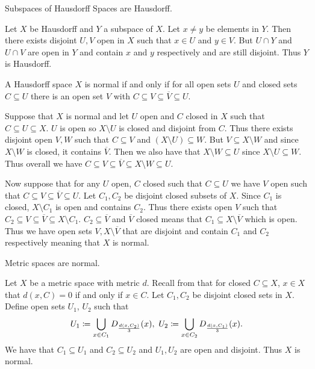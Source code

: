 \documentclass[letterpaper, 11pt]{article}
\begin{document}
\begin{exercise}
  Subspaces of Hausdorff Spaces are Hausdorff.
\end{exercise}
\begin{pf}
  Let $X$ be Hausdorff and $Y$ a subspace of $X$.
  Let $x \neq y$ be elements in $Y$.
  Then there exists disjoint $U, V$ open in $X$ such that $x \in U$ and $y \in V$.
  But $U \cap Y$ and $U \cap V$ are open in $Y$ and contain $x$ and $y$ respectively and are still disjoint.
  Thus $Y$ is Hausdorff.
\end{pf}

\begin{exercise}
  A Hausdorff space $X$ is normal if and only if for all open sets $U$ and closed sets $C \subseteq U$ there is an open set $V$ with $C \subseteq V \subseteq \overline{V} \subseteq U$.
\end{exercise}
\begin{pf}
  Suppose that $X$ is normal and let $U$ open and $C$ closed in $X$ such that $C \subseteq U \subseteq X$.
  $U$ is open so $X \setminus U$ is closed and disjoint from $C$.
  Thus there exists disjoint open $V, W$ such that $C \subseteq V$ and $(X \setminus U) \subseteq W$.
  But $V \subseteq X \setminus W$ and since $X \setminus W$ is closed, it contains $\overline{V}$.
  Then we also have that $X \setminus W \subseteq U$ since $X \setminus U \subseteq W$.
  Thus overall we have $C \subseteq V \subseteq \overline{V} \subseteq X \setminus W \subseteq U$.

  Now suppose that for any $U$ open, $C$ closed such that $C \subseteq U$ we have $V$ open such that $C \subseteq V \subseteq \overline{V} \subseteq U$.
  Let $C_{1}, C_{2}$ be disjoint closed subsets of $X$.
  Since $C_{1}$ is closed, $X \setminus C_{1}$ is open and contains $C_{2}$.
  Thus there exists open $V$ such that $C_{2} \subseteq V \subseteq \overline{V} \subseteq X \setminus C_{1}$.
  $C_{2} \subseteq \overline{V}$ and $\overline{V}$ closed means that $C_{1} \subseteq X \setminus \overline{V}$ which is open.
  Thus we have open sets $V, X \setminus \overline{V}$ that are disjoint and contain $C_{1}$ and $C_{2}$ respectively meaning that $X$ is normal.
\end{pf}

\begin{exercise}
  Metric spaces are normal.
\end{exercise}
\begin{pf}
  Let $X$ be a metric space with metric $d$.
  Recall from  that for closed $C \subseteq X$, $x \in X$ that $d(x, C) = 0$ if and only if $x \in C$.
  Let $C_{1}, C_{2}$ be disjoint closed sets in $X$.
  Define open sets $U_{1}$, $U_{2}$ such that
  \[
    U_{1} \coloneqq \bigcup_{x \in C_{1}} D_{\frac{d(x, C_{2})}{3}}(x),~ U_{2} \coloneqq \bigcup_{x \in C_{2}} D_{\frac{d(x, C_{1})}{3}}(x).
  \]
  We have that $C_{1} \subseteq U_{1}$ and $C_{2} \subseteq U_{2}$ and $U_{1}, U_{2}$ are open and disjoint.
  Thus $X$ is normal.
\end{pf}
\end{document}
